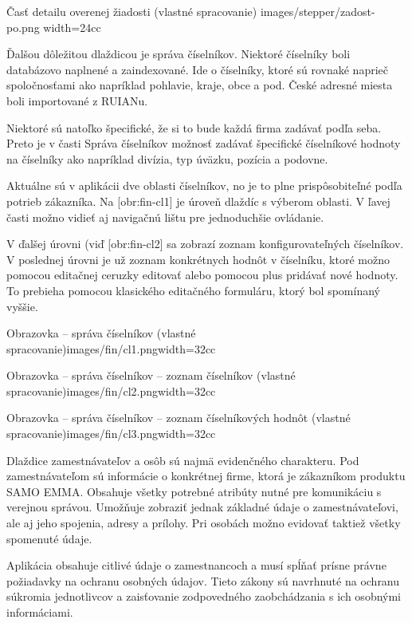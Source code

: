 {Časť detailu overenej žiadosti (vlastné spracovanie)}
{images/stepper/zadost-po.png}
{width=24cc}  



Ďalšou dôležitou dlaždicou je správa číselníkov. Niektoré číselníky boli databázovo naplnené a zaindexované. Ide o číselníky, ktoré sú rovnaké naprieč spoločnosťami ako napríklad pohlavie, kraje, obce a pod. České adresné miesta boli importované z RUIANu.

Niektoré sú natoľko špecifické, že si to bude každá firma zadávať podľa seba. Preto je v časti Správa číselníkov možnosť zadávať špecifické číselníkové hodnoty na číselníky ako napríklad divízia, typ úväzku, pozícia a podovne.

Aktuálne sú v aplikácii dve oblasti číselníkov, no je to plne prispôsobiteľné podľa potrieb zákazníka. Na [obr:fin-cl1] je úroveň dlaždíc s výberom oblasti. V ľavej časti možno vidieť aj navigačnú lištu pre jednoduchšie ovládanie. 

V ďalšej úrovni (viď [obr:fin-cl2] sa zobrazí zoznam konfigurovateľných číselníkov. V poslednej úrovni je už zoznam konkrétnych hodnôt v číselníku, ktoré možno pomocou editačnej ceruzky editovať alebo pomocou plus pridávať nové hodnoty. To prebieha pomocou klasického editačného formuláru, ktorý bol spomínaný vyššie.

{Obrazovka -- správa číselníkov (vlastné spracovanie)}{images/fin/cl1.png}{width=32cc} 

{Obrazovka -- správa číselníkov -- zoznam číselníkov (vlastné spracovanie)}{images/fin/cl2.png}{width=32cc} 

{Obrazovka -- správa číselníkov -- zoznam číselníkových hodnôt (vlastné spracovanie)}{images/fin/cl3.png}{width=32cc} 



Dlaždice zamestnávateľov a osôb sú najmä evidenčného charakteru. Pod zamestnávateľom sú informácie o konkrétnej firme, ktorá je zákazníkom produktu SAMO EMMA. Obsahuje všetky potrebné atribúty nutné pre komunikáciu s verejnou správou. Umožňuje zobraziť jednak základné údaje o zamestnávateľovi, ale aj jeho spojenia, adresy a prílohy. Pri osobách možno evidovať taktiež všetky spomenuté údaje.



Aplikácia obsahuje citlivé údaje o zamestnancoch a musí spĺňať prísne právne požiadavky na ochranu osobných údajov. Tieto zákony sú navrhnuté na ochranu súkromia jednotlivcov a zaisťovanie zodpovedného zaobchádzania s ich osobnými informáciami.

